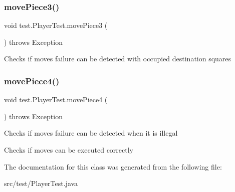 \subsubsection{\texorpdfstring{move\+Piece3()}{movePiece3()}}
{\footnotesize\ttfamily void test.\+Player\+Test.\+move\+Piece3 (\begin{DoxyParamCaption}{ }\end{DoxyParamCaption}) throws Exception}

Checks if moves failure can be detected with occupied destination squares \mbox{\label{classtest_1_1_player_test_ae63bfc10956604a272dfb769c713892f}} 
\subsubsection{\texorpdfstring{move\+Piece4()}{movePiece4()}}
{\footnotesize\ttfamily void test.\+Player\+Test.\+move\+Piece4 (\begin{DoxyParamCaption}{ }\end{DoxyParamCaption}) throws Exception}

Checks if moves failure can be detected when it is illegal

Checks if moves can be executed correctly 

The documentation for this class was generated from the following file\+:\begin{DoxyCompactItemize}
\item 
src/test/Player\+Test.\+java\end{DoxyCompactItemize}
